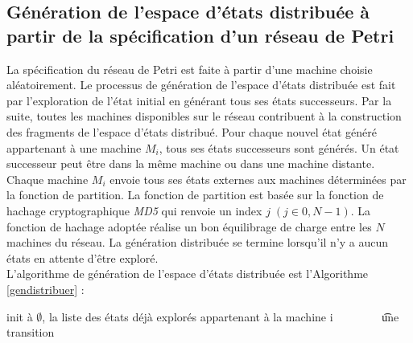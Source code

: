 \subsection{Génération de l’espace d’états distribuée à partir de la spécification d'un réseau de Petri}{
La spécification du réseau de Petri est faite à partir d'une machine choisie aléatoirement. Le processus de génération de l'espace d'états distribuée est fait par l’exploration de l’état initial en générant tous ses états successeurs. Par la suite, toutes les machines disponibles sur le réseau contribuent à la construction des fragments de l’espace d’états distribué. Pour chaque nouvel état généré appartenant à une machine $M_i$, tous ses états successeurs sont générés. Un état successeur peut être dans la même machine ou dans une machine distante. Chaque machine $M_i$ envoie tous ses états externes aux machines déterminées par la fonction de partition. La fonction de partition est basée sur la fonction de hachage cryptographique \emph{MD5} qui renvoie un index $j\;(j \in 0, N-1)$. La fonction de hachage adoptée réalise un bon équilibrage de charge entre les $N$ machines du réseau.  La génération distribuée se termine lorsqu'il n'y a aucun états en attente d'être exploré.\\
L’algorithme de génération de l’espace d’états distribuée est l'Algorithme \ref{gendistribuer} :\\
\begin{algorithm}
	\SetAlgoLined
	\SetAlgoLined	
	\AlgoDontDisplayBlockMarkers\SetAlgoNoEnd\SetAlgoNoLine%
	\si{init à $\emptyset$, la liste des états déjà explorés appartenant à la machine i }
	\t{une transition}


\end{algorithm}}
